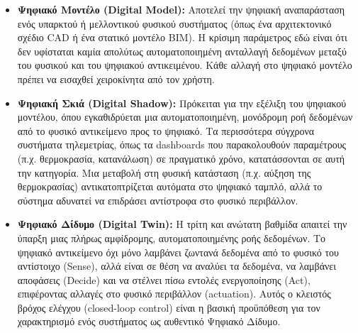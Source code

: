 \begin{itemize}
\item \textbf{Ψηφιακό Μοντέλο (Digital Model):} Αποτελεί την ψηφιακή αναπαράσταση ενός υπαρκτού ή μελλοντικού φυσικού συστήματος (όπως ένα αρχιτεκτονικό σχέδιο CAD ή ένα στατικό μοντέλο BIM). Η κρίσιμη παράμετρος εδώ είναι ότι δεν υφίσταται καμία απολύτως αυτοματοποιημένη ανταλλαγή δεδομένων μεταξύ του φυσικού και του ψηφιακού αντικειμένου. Κάθε αλλαγή στο ψηφιακό μοντέλο πρέπει να εισαχθεί χειροκίνητα από τον χρήστη.
\item \textbf{Ψηφιακή Σκιά (Digital Shadow):} Πρόκειται για την εξέλιξη του ψηφιακού μοντέλου, όπου εγκαθιδρύεται μια αυτοματοποιημένη, μονόδρομη ροή δεδομένων από το φυσικό αντικείμενο προς το ψηφιακό. Τα περισσότερα σύγχρονα συστήματα τηλεμετρίας, όπως τα dashboards που παρακολουθούν παραμέτρους (π.χ. θερμοκρασία, κατανάλωση) σε πραγματικό χρόνο, κατατάσσονται σε αυτή την κατηγορία. Μια μεταβολή στη φυσική κατάσταση (π.χ. αύξηση της θερμοκρασίας) αντικατοπτρίζεται αυτόματα στο ψηφιακό ταμπλό, αλλά το σύστημα αδυνατεί να επιδράσει αντίστροφα στο φυσικό περιβάλλον.
\item \textbf{Ψηφιακό Δίδυμο (Digital Twin):} Η τρίτη και ανώτατη βαθμίδα απαιτεί την ύπαρξη μιας πλήρως αμφίδρομης, αυτοματοποιημένης ροής δεδομένων. Το ψηφιακό αντικείμενο όχι μόνο λαμβάνει ζωντανά δεδομένα από το φυσικό του αντίστοιχο (Sense), αλλά είναι σε θέση να αναλύει τα δεδομένα, να λαμβάνει αποφάσεις (Decide) και να στέλνει πίσω εντολές ενεργοποίησης (Act), επιφέροντας αλλαγές στο φυσικό περιβάλλον (actuation). Αυτός ο κλειστός βρόχος ελέγχου (closed-loop control) είναι η βασική προϋπόθεση για τον χαρακτηρισμό ενός συστήματος ως αυθεντικό Ψηφιακό Δίδυμο.
\end{itemize}

